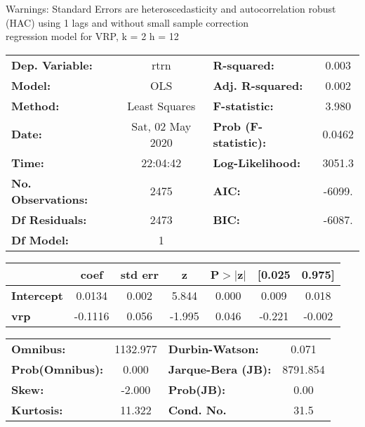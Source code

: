 Warnings: \newline
 [1] Standard Errors are heteroscedasticity and autocorrelation robust (HAC) using 1 lags and without small sample correction\\ 

regression model for VRP, k = 2 h = 12\begin{center}
\begin{tabular}{lclc}
\toprule
\textbf{Dep. Variable:}    &       rtrn       & \textbf{  R-squared:         } &     0.003   \\
\textbf{Model:}            &       OLS        & \textbf{  Adj. R-squared:    } &     0.002   \\
\textbf{Method:}           &  Least Squares   & \textbf{  F-statistic:       } &     3.980   \\
\textbf{Date:}             & Sat, 02 May 2020 & \textbf{  Prob (F-statistic):} &   0.0462    \\
\textbf{Time:}             &     22:04:42     & \textbf{  Log-Likelihood:    } &    3051.3   \\
\textbf{No. Observations:} &        2475      & \textbf{  AIC:               } &    -6099.   \\
\textbf{Df Residuals:}     &        2473      & \textbf{  BIC:               } &    -6087.   \\
\textbf{Df Model:}         &           1      & \textbf{                     } &             \\
\bottomrule
\end{tabular}
\begin{tabular}{lcccccc}
                   & \textbf{coef} & \textbf{std err} & \textbf{z} & \textbf{P$> |$z$|$} & \textbf{[0.025} & \textbf{0.975]}  \\
\midrule
\textbf{Intercept} &       0.0134  &        0.002     &     5.844  &         0.000        &        0.009    &        0.018     \\
\textbf{vrp}       &      -0.1116  &        0.056     &    -1.995  &         0.046        &       -0.221    &       -0.002     \\
\bottomrule
\end{tabular}
\begin{tabular}{lclc}
\textbf{Omnibus:}       & 1132.977 & \textbf{  Durbin-Watson:     } &    0.071  \\
\textbf{Prob(Omnibus):} &   0.000  & \textbf{  Jarque-Bera (JB):  } & 8791.854  \\
\textbf{Skew:}          &  -2.000  & \textbf{  Prob(JB):          } &     0.00  \\
\textbf{Kurtosis:}      &  11.322  & \textbf{  Cond. No.          } &     31.5  \\
\bottomrule
\end{tabular}
\end{center}

